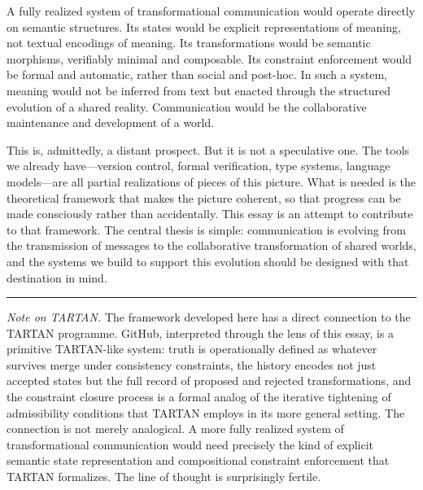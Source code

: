 \documentclass[12pt, letterpaper]{article}
\begin{document}
A fully realized system of transformational communication would operate directly on semantic structures. Its states would be explicit representations of meaning, not textual encodings of meaning. Its transformations would be semantic morphisms, verifiably minimal and composable. Its constraint enforcement would be formal and automatic, rather than social and post-hoc. In such a system, meaning would not be inferred from text but enacted through the structured evolution of a shared reality. Communication would be the collaborative maintenance and development of a world.

This is, admittedly, a distant prospect. But it is not a speculative one. The tools we already have---version control, formal verification, type systems, language models---are all partial realizations of pieces of this picture. What is needed is the theoretical framework that makes the picture coherent, so that progress can be made consciously rather than accidentally. This essay is an attempt to contribute to that framework. The central thesis is simple: communication is evolving from the transmission of messages to the collaborative transformation of shared worlds, and the systems we build to support this evolution should be designed with that destination in mind.

\vspace{2em}

\begin{center}
  \textcolor{rulecolor}{\rule{0.5\textwidth}{0.4pt}}
\end{center}

\vspace{1em}

\noindent\textit{Note on TARTAN.} The framework developed here has a direct connection to the TARTAN programme. GitHub, interpreted through the lens of this essay, is a primitive TARTAN-like system: truth is operationally defined as whatever survives merge under consistency constraints, the history encodes not just accepted states but the full record of proposed and rejected transformations, and the constraint closure process is a formal analog of the iterative tightening of admissibility conditions that TARTAN employs in its more general setting. The connection is not merely analogical. A more fully realized system of transformational communication would need precisely the kind of explicit semantic state representation and compositional constraint enforcement that TARTAN formalizes. The line of thought is surprisingly fertile.
\end{document}
